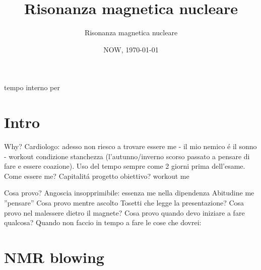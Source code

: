 \documentclass[10pt,xcolor={usenames},fleqn,mathserif,serif]{beamer}
\title{Risonanza magnetica nucleare}
\subtitle{Risonanza magnetica nucleare}
\date{NOW, \today}
\begin{document}


\begin{frame}
  \titlepage
\end{frame}

\begin{frame}{tempo interno per}
\tableofcontents[onlyparts]
\end{frame}


\part{Intro}

\begin{frame}[label={why}]{Why?}
Cardiologo: adesso non riesco a trovare essere me - il mio nemico \'e il sonno - workout condizione stanchezza (l'autunno/inverno scorso passato a pensare di fare e essere coazione).
Uso del tempo sempre come 2 giorni prima dell'esame.
Come essere me? Capitalit\'a progetto
obiettivo? workout me

\end{frame}

\begin{wordonframe}{Cosa provo?}
Angoscia insopprimibile: essenza me nella dipendenza
Abitudine me ''pensare''
Cosa provo mentre ascolto Tosetti che legge la presentazione?
Cosa provo nel malessere dietro il magnete?
Cosa provo quando devo iniziare a fare qualcosa?
Quando non faccio in tempo a fare le cose che dovrei: 
\end{wordonframe}

\part{NMR blowing}

\end{document}
